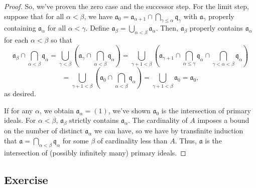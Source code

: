 \begin{proof}
So, we've proven the zero case and the successor step. For the limit step, suppose that for all $\alpha < \beta$, we have $\mathfrak{a}_0 = \mathfrak{a}_{\alpha + 1} \cap \bigcap_{\gamma \le \alpha} \mathfrak{q}_{\gamma}$
with $\mathfrak{a}_\gamma$ properly containing $\mathfrak{a}_{\alpha}$ for all $\alpha < \gamma$. Define $\mathfrak{a}_{\beta} = \bigcup_{\alpha < \beta}\mathfrak{a}_{\alpha}$. Then, $\mathfrak{a}_\beta$ properly contains
$\mathfrak{a}_\alpha$ for each $\alpha < \beta$ so that
$$\mathfrak{a}_\beta \cap \bigcap_{\alpha < \beta}\mathfrak{q}_\alpha = \bigcup_{\gamma < \beta}\left(\mathfrak{a}_{\gamma} \cap \bigcap_{\alpha < \beta} \mathfrak{q}_{\alpha}\right)
= \bigcup_{\gamma + 1 < \beta}\left(\mathfrak{a}_{\gamma + 1} \cap \bigcap_{\alpha \le \gamma} \mathfrak{q}_{\alpha} \cap \bigcap_{\gamma<\alpha<\beta}\mathfrak{q}_{\alpha}\right)$$
$$= \bigcup_{\gamma + 1 < \beta}\left(\mathfrak{a}_0 \cap \bigcap_{\alpha<\beta}\mathfrak{q}_{\alpha}\right) = \bigcup_{\gamma + 1 < \beta}\mathfrak{a}_0 = \mathfrak{a}_0,$$
as desired.

If for any $\alpha$, we obtain $\mathfrak{a}_{\alpha} = (1)$, we've shown $\mathfrak{a}_0$ is the intersection of primary ideals. For $\alpha < \beta$, $\mathfrak{a}_{\beta}$ strictly contains
$\mathfrak{a}_{\alpha}$. The cardinality of $A$ imposes a bound on the number of distinct $\mathfrak{a}_{\alpha}$ we can have, so we have by transfinite induction that 
$\mathfrak{a} = \bigcap_{\alpha < \beta}\mathfrak{q}_{\alpha}$ for some $\beta$ of cardinality less than $A$. Thus, $\mathfrak{a}$ is the intersection of (possibly infinitely many) primary ideals.
\end{proof}

\subsection{Exercise}\label{4.18}

